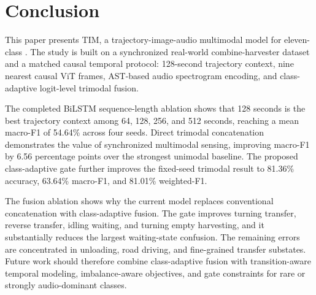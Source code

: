 \section{Conclusion}
\label{sec:conclusion}

This paper presents TIM, a trajectory-image-audio multimodal model for eleven-class \task{}. The study is built on a synchronized real-world combine-harvester dataset and a matched causal temporal protocol: 128-second trajectory context, nine nearest causal ViT frames, AST-based audio spectrogram encoding, and class-adaptive logit-level trimodal fusion.

The completed BiLSTM sequence-length ablation shows that 128 seconds is the best trajectory context among 64, 128, 256, and 512 seconds, reaching a mean macro-F1 of 54.64\% across four seeds. Direct trimodal concatenation demonstrates the value of synchronized multimodal sensing, improving macro-F1 by 6.56 percentage points over the strongest unimodal baseline. The proposed class-adaptive gate further improves the fixed-seed trimodal result to 81.36\% accuracy, 63.64\% macro-F1, and 81.01\% weighted-F1.

The fusion ablation shows why the current model replaces conventional concatenation with class-adaptive fusion. The gate improves turning transfer, reverse transfer, idling waiting, and turning empty harvesting, and it substantially reduces the largest waiting-state confusion. The remaining errors are concentrated in unloading, road driving, and fine-grained transfer substates. Future work should therefore combine class-adaptive fusion with transition-aware temporal modeling, imbalance-aware objectives, and gate constraints for rare or strongly audio-dominant classes.
